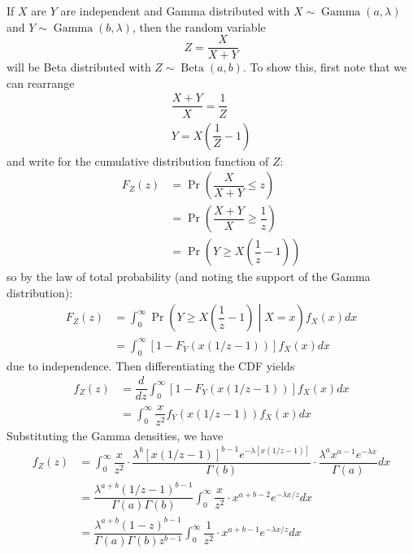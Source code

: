 \documentclass[11pt]{report} %
\begin{document}
If $X$ are $Y$ are independent and Gamma distributed with $X\sim \operatorname{Gamma}\left(a, \lambda\right)$ and $Y\sim \operatorname{Gamma}\left(b, \lambda\right)$, then the random variable
\begin{equation}
Z = \dfrac{X}{X + Y}
\end{equation}
will be Beta distributed with $Z \sim \operatorname{Beta}\left(a, b\right)$. To show this, first note that we can rearrange
\begin{gather}
\dfrac{X + Y}{X} = \dfrac{1}{Z} \\
Y = X\left(\dfrac{1}{Z} - 1\right)
\end{gather}
and write for the cumulative distribution function of $Z$:
\begin{align}
F_{Z}\left(z\right) &= \operatorname{Pr}\left(\dfrac{X}{X + Y} \leq z\right) \\
&= \operatorname{Pr}\left(\dfrac{X + Y}{X} \geq \dfrac{1}{z}\right) \\
&= \operatorname{Pr}\left(Y \geq X\left(\dfrac{1}{z} - 1\right)\right)
\end{align}
so by the law of total probability (and noting the support of the Gamma distribution):
\begin{align}
F_{Z}\left(z\right) &= \int_{0}^{\infty}\operatorname{Pr}\left(Y \geq X\left(\dfrac{1}{z} - 1\right)\middle|X = x\right)f_{X}\left(x\right)dx \\
&= \int_{0}^{\infty}\left[1 - F_{Y}\left(x\left(1/z - 1\right)\right)\right]f_{X}\left(x\right)dx
\end{align}
due to independence. Then differentiating the CDF yields
\begin{align}
f_{Z}\left(z\right) &= \dfrac{d}{dz}\int_{0}^{\infty}\left[1 - F_{Y}\left(x\left(1/z - 1\right)\right)\right]f_{X}\left(x\right)dx \\
&= \int_{0}^{\infty}\dfrac{x}{z^{2}}f_{Y}\left(x\left(1/z - 1\right)\right)f_{X}\left(x\right)dx
\end{align}
Substituting the Gamma densities, we have
\begin{align}
f_{Z}\left(z\right) &= \int_{0}^{\infty}\dfrac{x}{z^{2}}\cdot\dfrac{\lambda^{b}\left[x\left(1/z-1\right)\right]^{b-1}e^{-\lambda\left[x\left(1/z-1\right)\right]}}{\Gamma\left(b\right)}\cdot\dfrac{\lambda^{a}x^{a-1}e^{-\lambda x}}{\Gamma\left(a\right)}dx \\
&= \dfrac{\lambda^{a+b}\left(1/z-1\right)^{b-1}}{\Gamma\left(a\right)\Gamma\left(b\right)}\int_{0}^{\infty}\dfrac{x}{z^{2}}\cdot x^{a+b-2}e^{-\lambda x/z}dx \\
&= \dfrac{\lambda^{a+b}\left(1-z\right)^{b-1}}{\Gamma\left(a\right)\Gamma\left(b\right)z^{b-1}}\int_{0}^{\infty}\dfrac{1}{z^{2}}\cdot x^{a+b-1}e^{-\lambda x/z}dx
\end{align}
\end{document}
